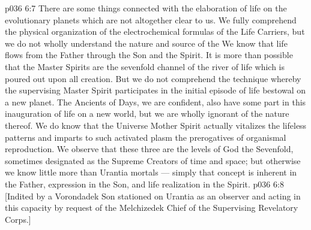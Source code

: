 \vs p036 6:7 \pc There are some things connected with the elaboration of life on the evolutionary planets which are not altogether clear to us. We fully comprehend the physical organization of the electrochemical formulas of the Life Carriers, but we do not wholly understand the nature and source of the  We know that life flows from the Father through the Son and  the Spirit. It is more than possible that the Master Spirits are the sevenfold channel of the river of life which is poured out upon all creation. But we do not comprehend the technique whereby the supervising Master Spirit participates in the initial episode of life bestowal on a new planet. The Ancients of Days, we are confident, also have some part in this inauguration of life on a new world, but we are wholly ignorant of the nature thereof. We do know that the Universe Mother Spirit actually vitalizes the lifeless patterns and imparts to such activated plasm the prerogatives of organismal reproduction. We observe that these three are the levels of God the Sevenfold, sometimes designated as the Supreme Creators of time and space; but otherwise we know little more than Urantia mortals --- simply that concept is inherent in the Father, expression in the Son, and life realization in the Spirit.
\vsetoff
\vs p036 6:8 [Indited by a Vorondadek Son stationed on Urantia as an observer and acting in this capacity by request of the Melchizedek Chief of the Supervising Revelatory Corps.]
